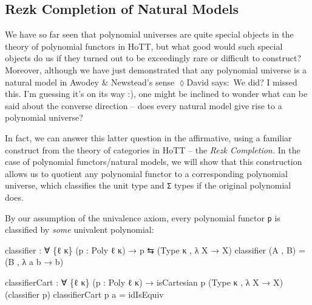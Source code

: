 \documentclass[
  11pt,
  oneside,
  article]{memoir}
\newenvironment{Shaded}{}{}
\newcommand{\NormalTok}[1]{#1}
\newcommand{\OtherTok}[1]{\textcolor[rgb]{0.00,0.44,0.13}{#1}}
\theoremstyle{definition}
\theoremstyle{plain}
\newcommand{\0}{\textsf{0}}
\newcommand{\1}{\tn{\textsf{1}}}
\newcommand{\dnote}[1]{{\quad \color{blue}$\lozenge$\;David says:}~#1\;{\color{blue}$\lozenge$}\quad}
\begin{document}
\subsection{Rezk Completion of Natural
Models}\label{rezk-completion-of-natural-models}

We have so far seen that polynomial universes are quite special objects
in the theory of polynomial functors in HoTT, but what good would such
special objects do us if they turned out to be exceedingly rare or
difficult to construct? Moreover, although we have just demonstrated
that any polynomial universe is a natural model in Awodey \& Newstead's
sense \dnote{We did? I missed this. I'm guessing it's on its way :)}, one might be inclined to wonder what can be said about the
converse direction -- does every natural model give rise to a polynomial
universe?

In fact, we can answer this latter question in the affirmative, using a
familiar construct from the theory of categories in HoTT -- the
\emph{Rezk Completion.} In the case of polynomial functors/natural
models, we will show that this construction allows us to quotient any
polynomial functor to a corresponding polynomial universe, which
classifies the unit type and \texttt{Σ} types if the
original polynomial does.

By our assumption of the univalence axiom, every polynomial functor
\texttt{p} is classified by \emph{some} univalent polynomial:

\begin{Shaded}
\begin{Highlighting}[]
\NormalTok{classifier }\OtherTok{:} \OtherTok{∀} \OtherTok{\{}\NormalTok{ℓ κ}\OtherTok{\}} \OtherTok{(}\NormalTok{p }\OtherTok{:}\NormalTok{ Poly ℓ κ}\OtherTok{)} \OtherTok{→}\NormalTok{ p ⇆ }\OtherTok{(}\NormalTok{Type κ , }\OtherTok{λ}\NormalTok{ X }\OtherTok{→}\NormalTok{ X}\OtherTok{)}
\NormalTok{classifier }\OtherTok{(}\NormalTok{A , B}\OtherTok{)} \OtherTok{=} \OtherTok{(}\NormalTok{B , }\OtherTok{λ}\NormalTok{ a b }\OtherTok{→}\NormalTok{ b}\OtherTok{)}

\NormalTok{classifierCart }\OtherTok{:} \OtherTok{∀} \OtherTok{\{}\NormalTok{ℓ κ}\OtherTok{\}} \OtherTok{(}\NormalTok{p }\OtherTok{:}\NormalTok{ Poly ℓ κ}\OtherTok{)} 
                 \OtherTok{→}\NormalTok{ isCartesian p }\OtherTok{(}\NormalTok{Type κ , }\OtherTok{λ}\NormalTok{ X }\OtherTok{→}\NormalTok{ X}\OtherTok{)}
                               \OtherTok{(}\NormalTok{classifier p}\OtherTok{)}
\NormalTok{classifierCart p a }\OtherTok{=}\NormalTok{ idIsEquiv}
\end{Highlighting}
\end{Shaded}
\end{document}
